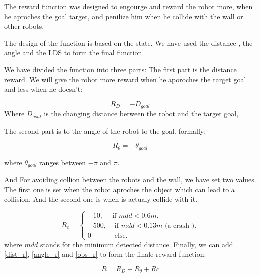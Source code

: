 \documentclass[12pt]{extarticle}
\begin{document}
The reward function was designed to engourge and reward the robot  more, when he  aproches the goal target, and penilize him when he collide with the wall or other robots.

The design of the function is based on the state. We have used the distance , the  angle and the LDS to form the final function.

We have   divided  the function into three parts:
The first part is  the distance reward. We will give the robot more reward when he aporoches the target goal and less when he doesn't:
   
\setcounter{equation}{0}

       \begin{equation} \label{dist_r}
     R_{D}=-D_{goal}
   \end{equation}
 Where $D_{goal}$  is the changing distance between the robot and the target goal,
    
The second part is to the angle of the robot to the goal. formally:



     \begin{equation} \label{angle_r}
     R_{\theta}=-\theta_{goal}
   \end{equation}
 
 where $\theta_{goal}$  ranges  between $-\pi$  and $\pi$.
  
And For avoiding collion between the robots and the wall, we have set two values. The first one is set  when the robot aproches the object which can lead to a collision. And the second one is when is actualy collide  with it.


\begin{equation}  \label{obs_r}
  R_{c}=\begin{cases}
    -10, & \text{if $mdd< 0.6m$}.\\
    -500 , & \text{ if $mdd <0.13m$ (a crash )}.\\
    0 & \text{ else}.
  \end{cases}
\end{equation}
where $mdd$ stands for the minimum detected distance.\linebreak
Finally, we can add \ref{dist_r}, \ref{angle_r} and \ref{obs_r} to form the finale reward function: 

 
    \begin{equation} \label{final_r}
     R=R_{D}+R_{\theta}+R{c}
   \end{equation}
\end{document}
